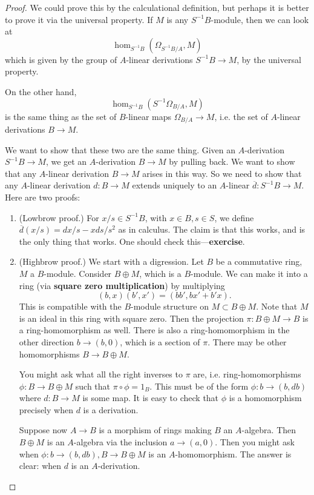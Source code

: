 \begin{proof} 
We could prove this by the calculational definition, but perhaps it is better
to prove it via the universal property. If $M$ is any $S^{-1}B$-module, then 
we can look at 
\[ \hom_{S^{-1}B}( \Omega_{S^{-1}B/A}, M)  \]
which is given by the group of $A$-linear derivations $S^{-1}B \to M$, by the
universal property. 

On the other hand, 
\[ \hom_{S^{-1}B}( S^{-1} \Omega_{B/A}, M)  \]
is the same thing as the set of $B$-linear maps $\Omega_{B/A} \to M$, i.e. the
set of $A$-linear derivations $B \to M$. 

We want to show that these two are the same thing. Given an $A$-derivation
$S^{-1}B \to M$, we get an $A$-derivation $B \to M$ by pulling back. We want to
show that any $A$-linear derivation $B \to M$ arises in this way. So we need to
show that any $A$-linear derivation $d: B \to M$ extends uniquely to an $A$-linear
$\overline{d}: S^{-1}B \to M$.
Here are two proofs:
\begin{enumerate}
\item (Lowbrow proof.) For $x/s \in S^{-1}B$, with $x \in B, s \in S$, we
define $\overline{d}(x/s) = dx/s - xds/s^2$ as in calculus. The claim is that
this works, and is the only thing that works. One should check
this---\textbf{exercise}.
\item (Highbrow proof.) We start with a digression. Let $B$ be a commutative
ring, $M$ a $B$-module. Consider $B \oplus M$, which is a  $B$-module. We can
make it into a ring (via \textbf{square zero multiplication}) by multiplying
\[ (b,x)(b',x') = (bb', bx'+b'x).  \]
This is compatible with the $B$-module structure on $M \subset B \oplus
M$. Note that $M$ is an ideal in this ring with square zero.  Then the
projection $\pi: B \oplus M \to B$ is a ring-homomorphism as well.
There is also a ring-homomorphism in the other direction $b \to (b,0)$, which
is a section of $\pi$. There may be other homomorphisms $B \to B \oplus M$.

You might ask what all the right inverses to $\pi$ are, i.e. ring-homomorphisms
$\phi:  B \to B \oplus M $ such that $\pi \circ \phi = 1_{B}$. This must be of
the form $\phi: b \to (b, db)$ where $d: B \to M$ is some map. It is easy to check
that $\phi$ is a homomorphism precisely when $d$ is a derivation.

Suppose now $A \to B$ is a morphism of rings making $B$ an $A$-algebra. Then
$B \oplus M$ is an $A$-algebra via the inclusion $a \to (a, 0)$. Then
you might ask when $\phi: b \to (b, db), B \to B \oplus M$ is an
$A$-homomorphism. The answer is clear: when $d$ is an $A$-derivation.


\end{enumerate}
\end{proof}

